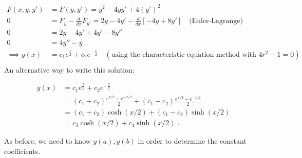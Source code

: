 \documentclass[a4paper]{article}
\begin{document}
\begin{align*}
F(x,y,y') &= F(y,y') = y^2 - 4yy' + 4(y')^2\\
0 &= F_y - \frac{d}{dx}F_{y'} = 2y - 4y' - \frac{d}{dx}\left[ -4y + 8y'\right] \quad \text{(Euler-Lagrange)} \\
0&= 2y-4y' +4y' -8y''\\
0&= 4y'' - y \\
\implies y(x) &= c_1e^{\frac{x}{2}} + c_2e^{-\frac{x}{2}} \quad (\text{using the characteristic equation method with } 4r^2 - 1 = 0)\\
\end{align*}
An alternative way to write this solution:

\begin{align*}
y(x) &= c_1e^{\frac{x}{2}} + c_2e^{-\frac{x}{2}} \\
&= (c_1+c_2)\frac{e^{x/2} + e^{-x/2}}{2} + (c_1 - c_2)\frac{e^{x/2} - e^{-x/2}}{2} \\
&= (c_1+c_2)\cosh(x/2) + (c_1-c_2)\sinh(x/2) \\
&= c_3\cosh(x/2) + c_4 \sinh(x/2) \;.
\end{align*}

As before, we need to know $y(a),y(b)$ in order to determine the constant coefficients. 
\end{document}

